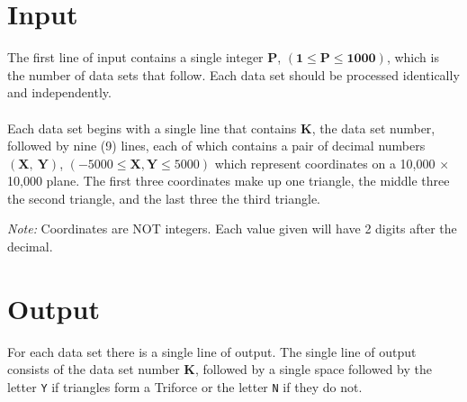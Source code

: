 \documentclass[11pt]{article}
\begin{document}
\section{Input}
The first line of input contains a single integer $\boldsymbol{P}$,
$(\boldsymbol{1} \le \boldsymbol{P} \le \boldsymbol{1000})$, which is the
number of data sets that follow. Each data set should be processed identically
and independently.
\\\\
Each data set begins with a single line that contains $\boldsymbol{K}$, the data
set number, followed by nine (9) lines, each of which contains a pair of decimal numbers
$(\boldsymbol{X},\ \boldsymbol{Y})$, $(-5000 \le \boldsymbol{X},\boldsymbol{Y} \le 5000)$
which represent coordinates on a 10,000 $\times$ 10,000 plane. The first three
coordinates make up one triangle, the middle three the second triangle, and
the last three the third triangle.
\begin{center}
\emph{Note:} Coordinates are NOT integers. Each value given will have 2 digits after the decimal.
\end{center}

\section{Output}
For each data set there is a single line of output. The single line of output
consists of the data set number $\boldsymbol{K}$, followed by a single space
followed by the letter \texttt{Y} if triangles form a Triforce or the letter
\texttt{N} if they do not.
\end{document}
